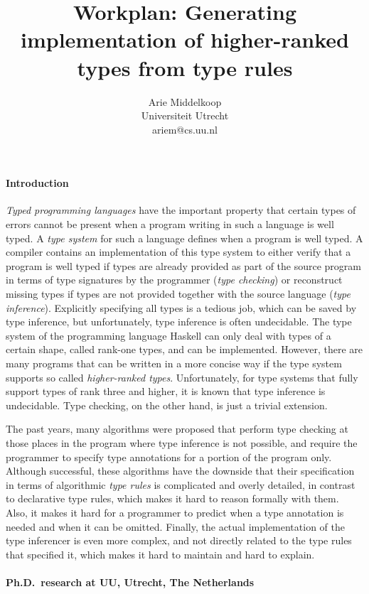 \documentclass[a4paper]{article}
\title{Workplan: Generating implementation of higher-ranked types from type rules}
\author{Arie Middelkoop\\Universiteit Utrecht\\ariem@cs.uu.nl}
\begin{document}
\maketitle

\paragraph{Introduction} {\it Typed programming languages} have the important property that certain types of errors cannot be present when a program writing in such a language is well typed. A {\it type system} for such a language defines when a program is well typed. A compiler contains an implementation of this type system to either verify that a program is well typed if types are already provided as part of the source program in terms of type signatures by the programmer ({\it type checking}) or reconstruct missing types if types are not provided together with the source language ({\it type inference}). Explicitly specifying all types is a tedious job, which can be saved by type inference, but unfortunately, type inference is often undecidable. The type system of the programming language Haskell can only deal with types of a certain shape, called rank-one types, and can be implemented. However, there are many programs that can be written in a more concise way if the type system supports so called {\it higher-ranked types}. Unfortunately, for type systems that fully support types of rank three and higher, it is known that type inference is undecidable. Type checking, on the other hand, is just a trivial extension.

The past years, many algorithms were proposed that perform type checking at those places in the program where type inference is not possible, and require the programmer to specify type annotations for a portion of the program only. Although successful, these algorithms have the downside that their specification in terms of algorithmic {\it type rules} is complicated and overly detailed, in contrast to declarative type rules, which makes it hard to reason formally with them. Also, it makes it hard for a programmer to predict when a type annotation is needed and when it can be omitted. Finally, the actual implementation of the type inferencer is even more complex, and not directly related to the type rules that specified it, which makes it hard to maintain and hard to explain.

\paragraph{Ph.D.~research at UU, Utrecht, The Netherlands}
\end{document}
